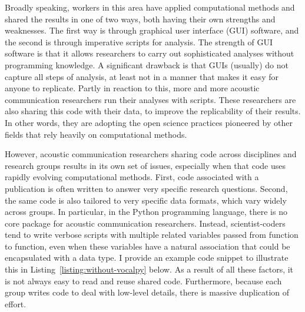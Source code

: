 \documentclass[11pt]{article}
\begin{document}
Broadly speaking, workers in this area have applied computational methods and shared the results in one of two ways, both having their own strengths and weaknesses.
The first way is through graphical user interface (GUI) software, and the second is through imperative scripts for analysis.
The strength of GUI software is that it allows researchers to carry out sophisticated analyses without programming knowledge.
A significant drawback is that GUIs (usually) do not capture all steps of analysis, at least not in a manner that makes it easy for anyone to replicate.
Partly in reaction to this,
more and more acoustic communication researchers run their analyses with scripts.
These researchers are also sharing this code with their data, to improve the replicability of their results.
In other words, they are adopting the open science practices pioneered by other fields that rely heavily on computational methods.

However, acoustic communication researchers sharing code across disciplines and research groups results in its own set of issues, especially when that code uses rapidly evolving computational methods.
First, code associated with a publication is often written to answer very specific research questions.
Second, the same code is also tailored to very specific data formats, which vary widely across groups.
In particular, in the Python programming language, there is no core package for acoustic communication researchers.
Instead, scientist-coders tend to write verbose scripts with multiple related variables passed from function to function, even when these variables have a natural association that could be encapsulated with a data type. I provide an example code snippet to illustrate this in Listing~\ref{listing:without-vocalpy} below.
As a result of all these factors, it is not always easy to read and reuse shared code.
Furthermore, because each group writes code to deal with low-level details, there is massive duplication of effort.
\end{document}
